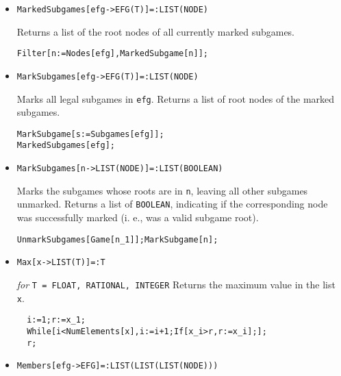\begin{itemize}
\item{}
\protect \large \begin{verbatim}
MarkedSubgames[efg->EFG(T)]=:LIST(NODE)
\end{verbatim}\normalsize

\bd 
Returns a list of the root nodes of all currently marked subgames.  
\begin{verbatim}
Filter[n:=Nodes[efg],MarkedSubgame[n]];
\end{verbatim} 
\ed

\item{}
\protect \large \begin{verbatim}
MarkSubgames[efg->EFG(T)]=:LIST(NODE)
\end{verbatim}\normalsize

\bd 
Marks all legal subgames in \verb+efg+.  Returns a list of root nodes
of the marked subgames.  
\begin{verbatim}
MarkSubgame[s:=Subgames[efg]];
MarkedSubgames[efg];
\end{verbatim} 
\ed


\item{}
\protect \large \begin{verbatim}
MarkSubgames[n->LIST(NODE)]=:LIST(BOOLEAN)
\end{verbatim}\normalsize

\bd 
Marks the subgames whose roots are in \verb+n+, leaving all other
subgames unmarked.  Returns a list of \verb+BOOLEAN+, indicating if
the corresponding node was successfully marked (i. e., was a valid
subgame root).
\begin{verbatim}
UnmarkSubgames[Game[n_1]];MarkSubgame[n];
\end{verbatim} 
\ed

\item{}
\protect \large \begin{verbatim}
Max[x->LIST(T)]=:T
\end{verbatim}\normalsize

{\it for} {\tt T = FLOAT, RATIONAL, INTEGER}
\bd 
Returns the maximum value in the list \verb+x+.  
\begin{verbatim}
  i:=1;r:=x_1;
  While[i<NumElements[x],i:=i+1;If[x_i>r,r:=x_i];];
  r;
\end{verbatim} 
\ed


\item{}
\protect \large \begin{verbatim}
Members[efg->EFG]=:LIST(LIST(LIST(NODE)))
\end{verbatim}\normalsize


\end{itemize}

